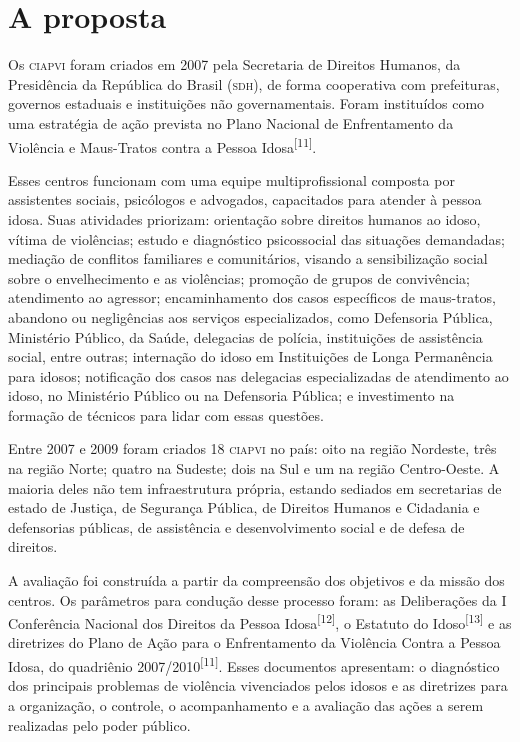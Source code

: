\documentclass{article}
\begin{document}
\section{A proposta}

Os \textsc{ciapvi} foram criados em 2007 pela Secretaria de Direitos Humanos, da
Presidência da República do Brasil (\textsc{sdh}), de forma cooperativa com prefeituras,
governos estaduais e instituições não governamentais. Foram instituídos como uma
estratégia de ação prevista no Plano Nacional de Enfrentamento da Violência e
Maus-Tratos contra a Pessoa Idosa\textsuperscript{[}\textsuperscript{11}\textsuperscript{]}.

Esses centros funcionam com uma equipe multiprofissional composta por
assistentes sociais, psicólogos e advogados, capacitados para atender à pessoa
idosa. Suas atividades priorizam: orientação sobre direitos humanos ao idoso,
vítima de violências; estudo e diagnóstico psicossocial das situações
demandadas; mediação de conflitos familiares e comunitários, visando a
sensibilização social sobre o envelhecimento e as violências; promoção de grupos
de convivência; atendimento ao agressor; encaminhamento dos casos específicos de
maus-tratos, abandono ou negligências aos serviços especializados, como
Defensoria Pública, Ministério Público, da Saúde, delegacias de polícia,
instituições de assistência social, entre outras; internação do idoso em
Instituições de Longa Permanência para idosos; notificação dos casos nas
delegacias especializadas de atendimento ao idoso, no Ministério Público ou na
Defensoria Pública; e investimento na formação de técnicos para lidar com essas
questões.

Entre 2007 e 2009 foram criados 18 \textsc{ciapvi} no país: oito na região Nordeste, três
na região Norte; quatro na Sudeste; dois na Sul e um na região Centro-Oeste. A
maioria deles não tem infraestrutura própria, estando sediados em secretarias de
estado de Justiça, de Segurança Pública, de Direitos Humanos e Cidadania e
defensorias públicas, de assistência e desenvolvimento social e de defesa de
direitos.

A avaliação foi construída a partir da compreensão dos objetivos e da missão dos
centros. Os parâmetros para condução desse processo foram: as Deliberações da I
Conferência Nacional dos Direitos da Pessoa
Idosa\textsuperscript{[}\textsuperscript{12}\textsuperscript{]}, o Estatuto do Idoso\textsuperscript{[}\textsuperscript{13}\textsuperscript{]}
e as diretrizes do Plano de Ação para o Enfrentamento da Violência Contra a
Pessoa Idosa, do quadriênio 2007/2010\textsuperscript{[}\textsuperscript{11}\textsuperscript{]}. Esses documentos apresentam: o diagnóstico dos principais problemas de
violência vivenciados pelos idosos e as diretrizes para a organização, o
controle, o acompanhamento e a avaliação das ações a serem realizadas pelo poder
público.
\end{document}
